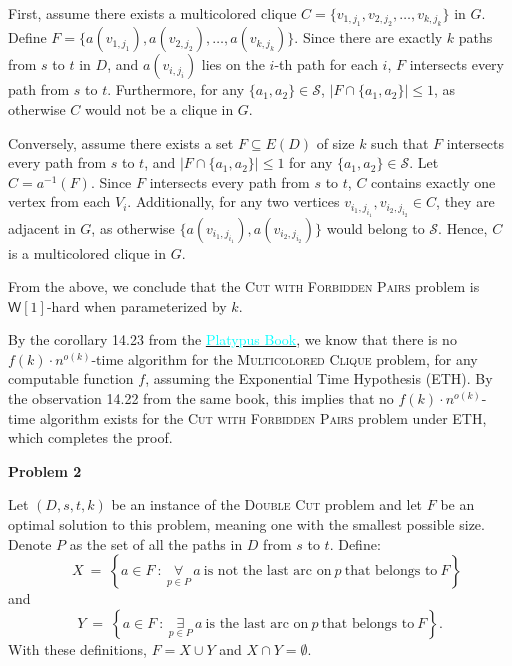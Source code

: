 \documentclass[12pt]{article}
\begin{document}
	First, assume there exists a multicolored clique \(C = \{v_{1, j_{1}},
	v_{2, j_{2}}, \ldots, v_{k, j_{k}}\}\) in \(G\). Define \(F =
	\{a(v_{1, j_{1}}), a(v_{2, j_{2}}), \ldots, a(v_{k, j_{k}})\}\). Since there
	are exactly \(k\) paths from \(s\) to \(t\) in \(D\), and
	\(a(v_{i, j_{i}})\) lies on the \(i\)-th path for each \(i\), \(F\)
	intersects every path from \(s\) to \(t\). Furthermore, for any \(\{a_{1},
	a_{2}\} \in \mathcal{S}\), \(|F \cap \{a_{1}, a_{2}\}| \leqslant 1\), as
	otherwise \(C\) would not be a clique in \(G\).
	
	\medskip
	
	Conversely, assume there exists a set \(F \subseteq E(D)\) of size \(k\)
	such that \(F\) intersects every path from \(s\) to \(t\), and \(|F \cap
	\{a_{1}, a_{2}\}| \leqslant 1\) for any \(\{a_{1}, a_{2}\} \in
	\mathcal{S}\). Let \(C = a^{-1}(F)\). Since \(F\) intersects every path from
	\(s\) to \(t\), \(C\) contains exactly one vertex from each \(V_{i}\).
	Additionally, for any two vertices \(v_{i_{1}, j_{i_{1}}},
	v_{i_{2}, j_{i_{2}}} \in C\), they are adjacent in \(G\), as otherwise
	\(\{a(v_{i_{1}, j_{i_{1}}}), a(v_{i_{2}, j_{i_{2}}})\}\) would belong to
	\(\mathcal{S}\). Hence, \(C\) is a multicolored clique in \(G\).
	
	\medskip
	
	From the above, we conclude that the \textsc{Cut with Forbidden Pairs}
	problem is \(\mathsf{W}[1]\)-hard when parameterized by \(k\).
	
	\medskip
	
	By the corollary 14.23 from the
	\href{https://parameterized-algorithms.mimuw.edu.pl/}
	{\textcolor{cyan}{Platypus Book}}, we know that there is no \(f(k) \cdot
	n^{o(k)}\)-time algorithm for the \textsc{Multicolored Clique} problem, for
	any computable function \(f\), assuming the Exponential Time Hypothesis
	(ETH). By the observation 14.22 from the same book, this implies that no
	\(f(k) \cdot n^{o(k)}\)-time algorithm exists for the \textsc{Cut with
	Forbidden Pairs} problem under ETH, which completes the proof.
	
	\newpage
	
	\textbf{Problem 2}
	
	\medskip
	
	Let \((D, s, t, k)\) be an instance of the \textsc{Double Cut} problem and
	let \(F\) be an optimal solution to this problem, meaning one with the
	smallest possible size. Denote \(P\) as the set of all the paths in \(D\)
	from \(s\) to \(t\). Define:
	\[ \quad X \ = \ \left\{a \in F \ : \ \underset{p \in P}{\forall} \ a \
	\text{is not the last arc on} \ p \ \text{that belongs to} \ F \right\} \]
	and
	\[ Y \ = \ \left\{a \in F \ : \ \underset{p \in P}{\exists} \ a \
	\text{is the last arc on} \ p \ \text{that belongs to} \ F \right\}
	\text{.} \]
	With these definitions, \(F = X \cup Y\) and \(X \cap Y = \emptyset\).
	
\end{document}
